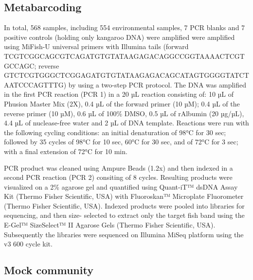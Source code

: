 \documentclass[9pt,twoside,lineno]{pnas-new}
\begin{document}
\subsection*{Metabarcoding}
In total, 568 samples, including 554 environmental samples, 7 PCR blanks and 7 positive controls (holding only kangaroo DNA) were amplified were amplified using MiFish-U universal primers \cite{miya2015} with Illumina tails (forward TCGTCGGCAGCGTCAGATGTGTATAAGAGACAGGCCGGTAAAACTCGTGCCAGC; reverse GTCTCGTGGGCTCGGAGATGTGTATAAGAGACAGCATAGTGGGGTATCTAATCCCAGTTTG) by using a two-step PCR protocol. The DNA was amplified in the first PCR reaction (PCR 1) in a 20 µL reaction consisting of: 10 µL of Phusion Master Mix (2X), 0.4 µL of the forward primer (10 µM); 0.4 µL of the reverse primer (10 µM), 0.6 µL of 100\% DMSO, 0.5 µL of rAlbumin (20 µg/µL), 4.4 µL of nuclease-free water and 2 µL of DNA template. Reactions were run with the following cycling conditions: an initial denaturation of 98°C for 30 sec; followed by 35 cycles of 98°C for 10 sec, 60°C for 30 sec, and of 72°C for 3 sec; with a final extension of 72°C for 10 min. 

PCR product was cleaned using Ampure Beads (1.2x) and then indexed in a second PCR reaction (PCR 2) consiting of 8 cycles. Resulting products were visualized on a 2\% agarose gel and quantified using Quant-iT™ dsDNA Assay Kit (Thermo Fisher Scientific, USA) with Fluoroskan™ Microplate Fluorometer (Thermo Fisher Scientific, USA). Indexed products were pooled into libraries for sequencing, and then size- selected to extract only the target fish band using the E-Gel™ SizeSelect™ II Agarose Gels (Thermo Fisher Scientific, USA).  Subsequently the libraries were sequenced on Illumina MiSeq platform using the v3 600 cycle kit. 


\subsection*{Mock community}
\end{document}
